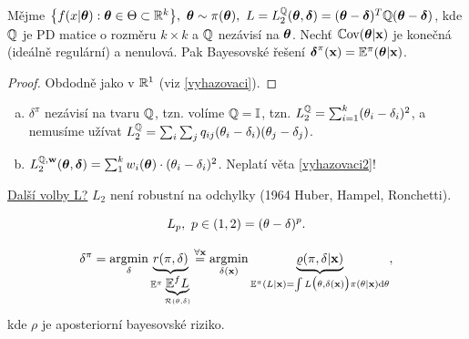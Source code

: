 \begin{theorem}\label{vyhazovaci2}
	Mějme $\big\{ f(x|\boldsymbol{\theta}):\boldsymbol{\theta}\in\Theta\subset\mathbb{R}^k \big\},~\boldsymbol{\theta}\sim\pi(\boldsymbol{\theta}),~L=L_2^{\mathbb{Q}}(\boldsymbol{\theta},\boldsymbol{\delta})=(\boldsymbol{\theta}-\boldsymbol{\delta})^T\mathbb{Q}(\boldsymbol{\theta}-\boldsymbol{\delta})$, kde $\mathbb{Q}$ je PD matice o rozměru $k\times k $ a $\mathbb{Q}$ nezávisí na $\boldsymbol{\theta}$. Nechť $\mathbb{C}\mathrm{ov}(\boldsymbol{\theta}|\textbf{x})$ je konečná (ideálně regulární) a nenulová. Pak Bayesovské řešení $\boldsymbol{\delta}^\pi(\textbf{x})=\mathbb{E}^\pi(\boldsymbol{\theta}|\textbf{x})$. 
	\begin{proof}
		Obdodně jako v $\mathbb{R}^1$ (viz \ref{vyhazovaci}).
	\end{proof}
\end{theorem}
\begin{remark}
	\begin{enumerate}[a)]
		\item $\delta^\pi$ nezávisí na tvaru $\mathbb{Q}$, tzn. volíme $\mathbb{Q}=\mathbb{I}$, tzn. $L_2^{\mathbb{Q}}=\sum_{i=1}^k (\theta_i-\delta_i)^2$, a nemusíme užívat $L_2^{\mathbb{Q}}=\sum_i\sum_j q_{ij}(\theta_i-\delta_i)(\theta_j-\delta_j)$.
		\item $L_2^{\mathbb{Q},\textbf{w}}(\boldsymbol{\theta},\boldsymbol{\delta})=\sum_1^k w_i(\boldsymbol{\theta})\cdot(\theta_i-\delta_i)^2$. Neplatí věta \ref{vyhazovaci2}! 
	\end{enumerate}
\end{remark}

\underline{Další volby L?}
$L_2$ není robustní na odchylky (1964 Huber, Hampel, Ronchetti). 

$$ L_p,~p\in(1,2)=(\theta-\delta)^p.$$

$$\delta^\pi=\mathop{\mathrm{argmin}}_\delta \underbrace{r(\pi,\delta)}_{\mathbb{E}^\pi\underbrace{\mathbb{E}^f L}_{\mathcal{R}(\theta,\delta)}}\stackrel{\forall\textbf{x}}{=}\mathop{\mathrm{argmin}}_{\delta(\textbf{x})}\underbrace{\varrho(\pi,\delta|\textbf{x})}_{\mathbb{E}^\pi(L|\textbf{x})=\int L\big(\theta,\delta(\textbf{x})\big)\pi(\theta|\textbf{x})\mathrm{d}\theta},$$ kde $\rho$ je aposteriorní bayesovské riziko.


